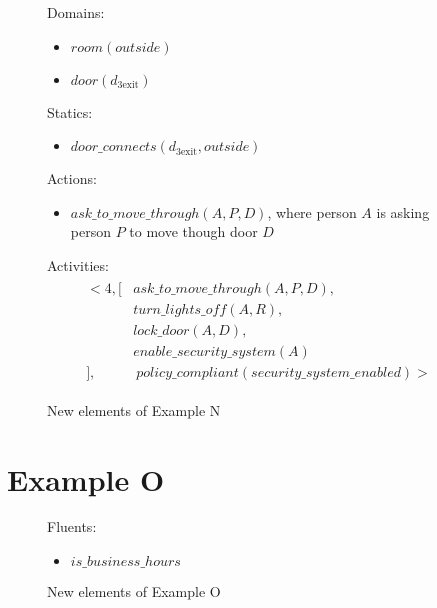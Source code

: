 \begin{figure}[H]
    \begin{framed}
        Domains:
        \begin{itemize}
            \item $room(outside)$
            \item $door(d_{3\text{exit}})$
        \end{itemize}

        Statics:
        \begin{itemize}
            \item $door\_connects(d_{3\text{exit}}, outside)$
        \end{itemize}

        Actions:
        \begin{itemize}
            \item $ask\_to\_move\_through(A, P, D)$, where person $A$ is asking person $P$ to move though door $D$
        \end{itemize}

        Activities:
        \begin{gather}
        \begin{split}
            <4, [
                & ask\_to\_move\_through(A, P, D), \\
                & turn\_lights\_off(A, R), \\
                & lock\_door(A, D), \\
                & enable\_security\_system(A) \\
            ], & \ policy\_compliant(security\_system\_enabled)>
        \end{split}
        \end{gather}
    \end{framed}
    \caption{New elements of Example N}
    \label{fig:apia_example_n_description}
\end{figure}

\section{Example O}

\begin{figure}[H]
    \begin{framed}
        Fluents:
        \begin{itemize}
            \item $is\_business\_hours$
        \end{itemize}
    \end{framed}
    \caption{New elements of Example O}
    \label{fig:apia_example_o_description}
\end{figure}


